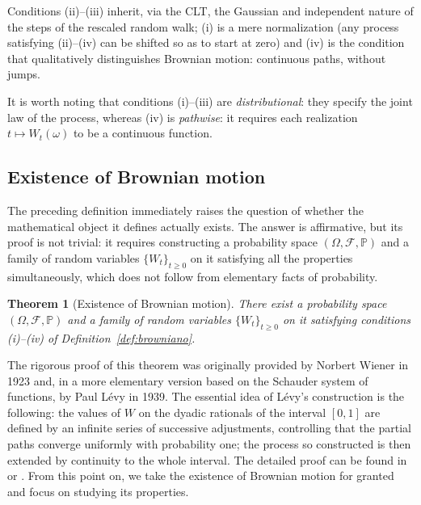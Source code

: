 \documentclass[11pt,a4paper,oneside]{report}
\theoremstyle{plain}
\newtheorem{teorema}{Theorem}[chapter]
\theoremstyle{definition}
\theoremstyle{remark}
\newcommand{\PP}{\mathbb{P}}
\newcommand{\F}{\mathcal{F}}
\newcommand{\1}{\mathbf{1}}
\begin{document}
Conditions (ii)–(iii) inherit, via the CLT, the Gaussian and
independent nature of the steps of the rescaled random walk; (i) is a
mere normalization (any process satisfying (ii)–(iv) can be shifted
so as to start at zero) and (iv) is the condition that qualitatively
distinguishes Brownian motion: continuous paths, without jumps.

It is worth noting that conditions (i)–(iii) are
\emph{distributional}: they specify the joint law of the process,
whereas (iv) is \emph{pathwise}: it requires each realization
$t \mapsto W_t(\omega)$ to be a continuous function.

\newpage

\subsection{Existence of Brownian motion}
\label{subsec:browniano_existencia}

The preceding definition immediately raises the question of whether
the mathematical object it defines actually exists. The answer is
affirmative, but its proof is not trivial: it requires constructing a
probability space $(\Omega, \F, \PP)$ and a family of random variables
$\{W_t\}_{t \geq 0}$ on it satisfying all the properties
simultaneously, which does not follow from elementary facts of
probability.

\begin{teorema}[Existence of Brownian motion]
\label{teo:existencia_browniano}
There exist a probability space $(\Omega, \F, \PP)$ and a family of
random variables $\{W_t\}_{t \geq 0}$ on it satisfying conditions
(i)--(iv) of Definition~\ref{def:browniano}.
\end{teorema}

The rigorous proof of this theorem was originally provided by Norbert
Wiener in 1923 and, in a more elementary version based on the Schauder
system of functions, by Paul Lévy in 1939. The essential idea of
Lévy's construction is the following: the values of $W$ on the dyadic
rationals of the interval $[0, 1]$ are defined by an infinite series
of successive adjustments, controlling that the partial paths converge
uniformly with probability one; the process so constructed is then
extended by continuity to the whole interval. The detailed proof can
be found in \cite{karatzas-shreve} or \cite{williams}. From this point
on, we take the existence of Brownian motion for granted and focus on
studying its properties.
\end{document}
